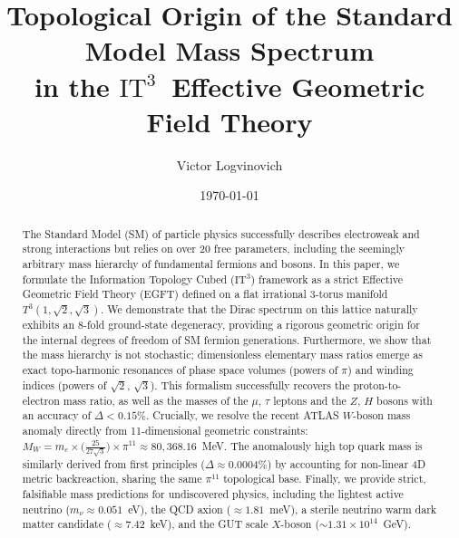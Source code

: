 \documentclass[onecolumn,aps,prd,superscriptaddress,nofootinbib,amsmath,amssymb]{revtex4-2}
\newcommand{\ITthree}{\ensuremath{\mathrm{IT}^3}}
\begin{document}
\title{Topological Origin of the Standard Model Mass Spectrum \\ in the \ITthree\ Effective Geometric Field Theory}

\author{Victor Logvinovich}

\date{\today}

\begin{abstract}
The Standard Model (SM) of particle physics successfully describes electroweak and strong interactions but relies on over 20 free parameters, including the seemingly arbitrary mass hierarchy of fundamental fermions and bosons. In this paper, we formulate the Information Topology Cubed (\ITthree) framework as a strict Effective Geometric Field Theory (EGFT) defined on a flat irrational 3-torus manifold $T^3(1,\sqrt{2},\sqrt{3})$. We demonstrate that the Dirac spectrum on this lattice naturally exhibits an 8-fold ground-state degeneracy, providing a rigorous geometric origin for the internal degrees of freedom of SM fermion generations. Furthermore, we show that the mass hierarchy is not stochastic; dimensionless elementary mass ratios emerge as exact topo-harmonic resonances of phase space volumes (powers of $\pi$) and winding indices (powers of $\sqrt{2}$, $\sqrt{3}$). This formalism successfully recovers the proton-to-electron mass ratio, as well as the masses of the $\mu$, $\tau$ leptons and the $Z$, $H$ bosons with an accuracy of $\Delta < 0.15\%$. Crucially, we resolve the recent ATLAS $W$-boson mass anomaly directly from 11-dimensional geometric constraints: $M_W = m_e \times \big(\frac{25}{27\sqrt{3}}\big) \times \pi^{11} \approx 80,368.16$~MeV. The anomalously high top quark mass is similarly derived from first principles ($\Delta \approx 0.0004\%$) by accounting for non-linear 4D metric backreaction, sharing the same $\pi^{11}$ topological base. Finally, we provide strict, falsifiable mass predictions for undiscovered physics, including the lightest active neutrino ($m_{\nu} \approx 0.051$~eV), the QCD axion ($\approx 1.81$~meV), a sterile neutrino warm dark matter candidate ($\approx 7.42$~keV), and the GUT scale $X$-boson ($\sim 1.31 \times 10^{14}$~GeV).
\end{abstract}


\maketitle
\end{document}
